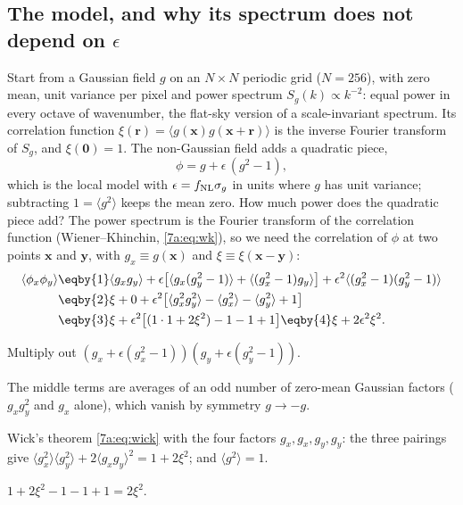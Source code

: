 \subsection{The model, and why its spectrum does not depend on $\epsilon$}
\label{12c:sec:model}

Start from a Gaussian field $g$ on an $N\times N$ periodic grid ($N=256$), with zero mean, unit variance per pixel and
power spectrum $S_g(k)\propto k^{-2}$: equal power in every octave of wavenumber, the flat-sky version of a
scale-invariant spectrum. Its correlation function $\xi(\bm r)=\langle g(\bm x)g(\bm x+\bm r)\rangle$ is the inverse
Fourier transform of $S_g$, and $\xi(\bm 0)=1$. The non-Gaussian field adds a quadratic piece,
\begin{equation}
  \phi=g+\epsilon\,(g^2-1),
  \label{12c:eq:local}
\end{equation}
which is the local model with $\epsilon=f_{\rm NL}\sigma_g$ in units where $g$ has unit variance; subtracting $1=\langle
g^2\rangle$ keeps the mean zero. How much power does the quadratic piece add? The power spectrum is the Fourier
transform of the correlation function (Wiener--Khinchin, \eqref{7a:eq:wk}), so we need the correlation of $\phi$ at two
points $\bm x$ and $\bm y$, with $g_x\equiv g(\bm x)$ and $\xi\equiv\xi(\bm x-\bm y)$:
\begin{align}
  \langle\phi_x\phi_y\rangle
  &\eqby{1}\langle g_xg_y\rangle+\epsilon\bigl[\langle g_x(g_y^2-1)\rangle+\langle(g_x^2-1)g_y\rangle\bigr]
   +\epsilon^2\langle(g_x^2-1)(g_y^2-1)\rangle\nonumber\\
  &\eqby{2}\xi+0+\epsilon^2\bigl[\langle g_x^2g_y^2\rangle-\langle g_x^2\rangle-\langle g_y^2\rangle+1\bigr]\nonumber\\
  &\eqby{3}\xi+\epsilon^2\bigl[(1\cdot1+2\xi^2)-1-1+1\bigr]
   \eqby{4}\xi+2\epsilon^2\xi^2 .
  \label{12c:eq:xi-phi}
\end{align}
\begin{explain}
  \item Multiply out $(g_x+\epsilon(g_x^2-1))(g_y+\epsilon(g_y^2-1))$.
  \item The middle terms are averages of an odd number of zero-mean Gaussian factors ($g_xg_y^2$ and $g_x$ alone),
        which vanish by symmetry $g\to-g$.
  \item Wick's theorem \eqref{7a:eq:wick} with the four factors $g_x,g_x,g_y,g_y$: the three pairings give
        $\langle g_x^2\rangle\langle g_y^2\rangle+2\langle g_xg_y\rangle^2=1+2\xi^2$; and $\langle g^2\rangle=1$.
  \item $1+2\xi^2-1-1+1=2\xi^2$.
\end{explain}
